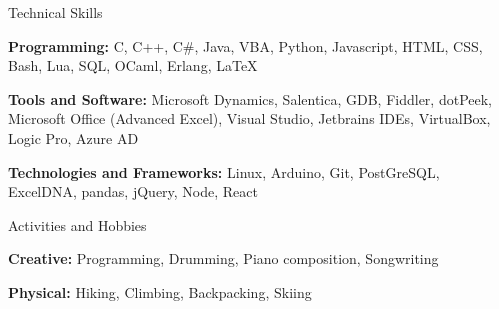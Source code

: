 \documentclass{resume} %
\begin{document}
\begin{rSection}{Technical Skills}

    {\bf Programming:}  C, C++, C\#, Java, VBA, Python, Javascript, HTML, CSS, Bash, Lua, SQL, OCaml, Erlang, LaTeX
    \vspace{-1mm}
    \item {\bf Tools and Software:} Microsoft Dynamics, Salentica, GDB, Fiddler, dotPeek, Microsoft Office (Advanced Excel), Visual Studio, Jetbrains IDEs, VirtualBox, Logic Pro, Azure AD
    \vspace{-1mm}
    \item {\bf Technologies and Frameworks:} Linux, Arduino, Git, PostGreSQL, ExcelDNA, pandas, jQuery, Node, React

\vspace{-1mm}
\end{rSection}
\vspace{-1mm}
\begin{rSection}{Activities and Hobbies}

{\bf Creative: }Programming, Drumming, Piano composition, Songwriting
\vspace{-1mm}
\item {\bf Physical: }Hiking, Climbing, Backpacking, Skiing
  


\vspace{-1mm}
\end{rSection}
\vspace{-1mm}
\end{document}
